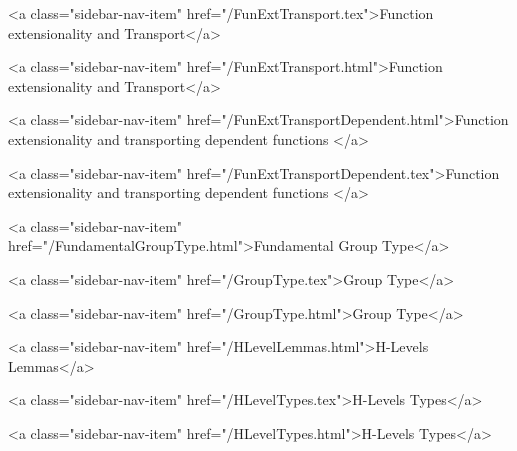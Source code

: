       
    
      
        
          <a class="sidebar-nav-item" href="/FunExtTransport.tex">Function extensionality and Transport</a>
        
      
    
      
        
          <a class="sidebar-nav-item" href="/FunExtTransport.html">Function extensionality and Transport</a>
        
      
    
      
        
          <a class="sidebar-nav-item" href="/FunExtTransportDependent.html">Function extensionality and transporting dependent functions </a>
        
      
    
      
        
          <a class="sidebar-nav-item" href="/FunExtTransportDependent.tex">Function extensionality and transporting dependent functions </a>
        
      
    
      
        
          <a class="sidebar-nav-item" href="/FundamentalGroupType.html">Fundamental Group Type</a>
        
      
    
      
        
          <a class="sidebar-nav-item" href="/GroupType.tex">Group Type</a>
        
      
    
      
        
          <a class="sidebar-nav-item" href="/GroupType.html">Group Type</a>
        
      
    
      
        
          <a class="sidebar-nav-item" href="/HLevelLemmas.html">H-Levels Lemmas</a>
        
      
    
      
        
          <a class="sidebar-nav-item" href="/HLevelTypes.tex">H-Levels Types</a>
        
      
    
      
        
          <a class="sidebar-nav-item" href="/HLevelTypes.html">H-Levels Types</a>
        
      
    

